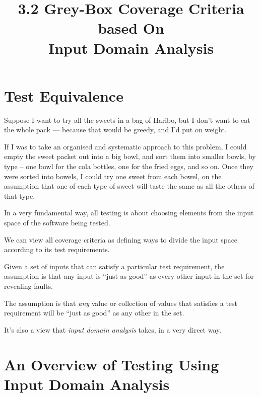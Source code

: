 



\title{3.2 Grey-Box Coverage Criteria based On \\ Input Domain Analysis}

\section{Test Equivalence}
%

Suppose I want to try all the sweets in a bag of Haribo, but I don't want to eat
the whole pack --- because that would be greedy, and I'd put on weight.


If I was to take an organised and systematic approach to this problem, I could
empty the sweet packet out into a big bowl, and sort them into smaller bowls,
by type -- one bowl for the cola bottles, one for the fried eggs, and so on.
Once they were sorted into bowels, I could try one sweet from each bowel, on the
assumption that one of each type of sweet will taste the same as all the others
of that type. 



In a very fundamental way, all testing is about choosing elements from the input
space of the software being tested. 

We can view all coverage criteria as defining ways to divide the input space
according to its test requirements. 

Given a set of inputs that can satisfy a particular test requirement, the
assumption is that any input is ``just as good'' as every other input in the set
for revealing faults. 

The assumption is that {\it any} value or collection of values that satisfies a
test requirement will be ``just as good'' as any other in the set. 

It's also a view that {\it input domain analysis} takes, in a very direct way.


\section{An Overview of Testing Using Input Domain Analysis}

